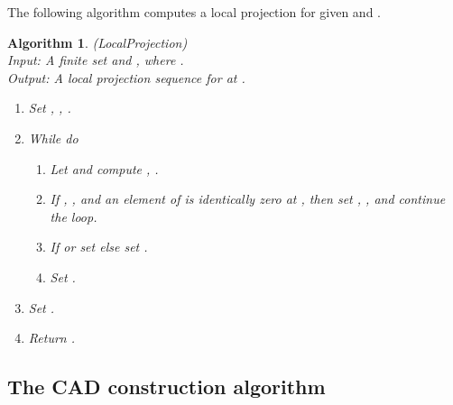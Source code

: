 \documentclass[english]{amsart}
\numberwithin{equation}{section}
\numberwithin{figure}{section}
\newtheorem{algorithm}[thm]{Algorithm}
\begin{document}
The following algorithm computes a local projection for given 
and . 
\begin{algorithm}
\label{alg:LocalProj}(LocalProjection)\\
Input:\emph{ A finite set }
\emph{and }\emph{, where
.}\textup{}\\
\textup{\emph{Output:}}\textup{ A local projection sequence} 
\emph{for  at .}\textup{ }
\begin{enumerate}
\item Set , , .
\item While  do

\begin{enumerate}
\item Let  and compute ,
.
\item If , , and an element of  is identically
zero at , then set , ,  and
continue the loop.
\item If  or  set 
else set .
\item Set .
\end{enumerate}
\item Set .
\item Return .
\end{enumerate}
\end{algorithm}

\subsection{The CAD construction algorithm}
\end{document}
